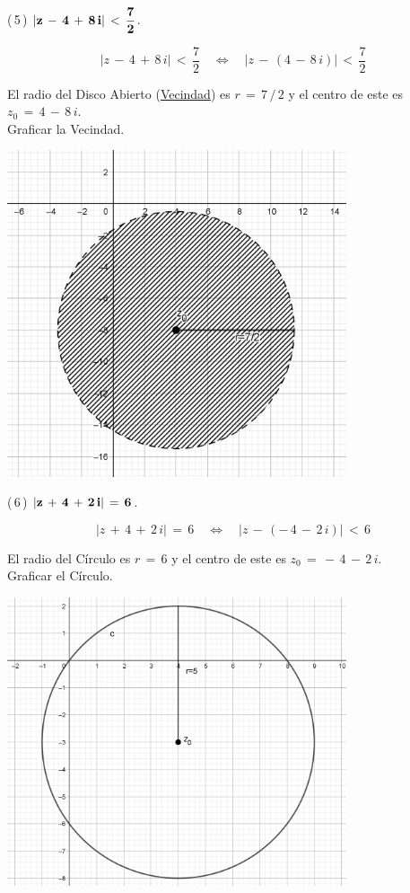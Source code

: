 \documentclass[a4paper,11pt,openany]{book}
\begin{document}
\textcolor{ao(english)}{(\,5\,)} $\bf{|z\,-\,4\,+\,8\,i|\,<\,\dfrac{7}{2}}$.

$$|z\,-\,4\,+\,8\,i|\,<\,\dfrac{7}{2} \quad\iff\quad |z\,-\,(4\,-\,8\,i)|\,<\,\dfrac{7}{2}$$

El radio del Disco Abierto (\underline{Vecindad}) es $r\,=\,7\,/\,2$ y el centro de este es $z_{0}\,=\,4\,-\,8\,i$.\\

\textcolor{ao(english)}{} Graficar la Vecindad.

\begin{center}
    \includegraphics[width=10cm]{Gra-Ej-5.png}
\end{center}

\textcolor{ao(english)}{(\,6\,)} $\bf{|z\,+\,4\,+\,2\,i|\,=\,6}$.

$$|z\,+\,4\,+\,2\,i|\,=\,6 \quad\iff\quad |z\,-\,(-\,4\,-\,2\,i)|\,<\,6$$

El radio del Círculo es $r\,=\,6$ y el centro de este es $z_{0}\,=\,-\,4\,-\,2\,i$.\\

\textcolor{ao(english)}{} Graficar el Círculo.

\begin{center}
     \includegraphics[width=10cm]{Gra-Ej-1.png}
\end{center}
\end{document}
